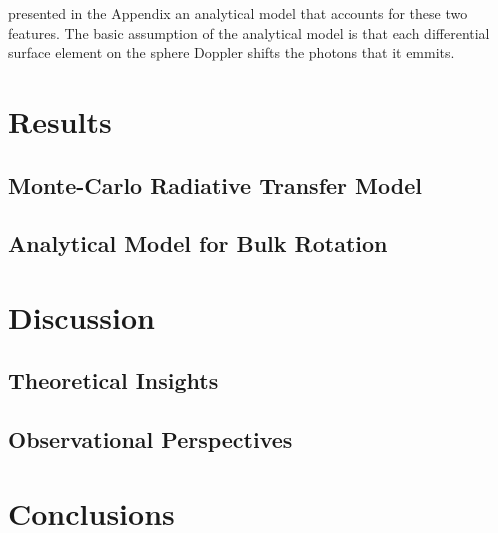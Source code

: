 \documentclass[a4,useAMS,usenatbib,usegraphicx]{mn2e}
\begin{document}
  
\cite{Garavito14} presented in the Appendix an analytical model that
accounts for these two features.
The basic assumption of the analytical model is that each
differential surface element on the sphere Doppler shifts the photons
that it emmits. 




\section{Results}
\label{sec:results}

\subsection{Monte-Carlo Radiative Transfer Model}

\subsection{Analytical Model for Bulk Rotation}

\section{Discussion}
\label{sec:discussion}

\subsection{Theoretical Insights}

\subsection{Observational Perspectives}

\section{Conclusions}
\label{sec:conclusions}



\end{document}
